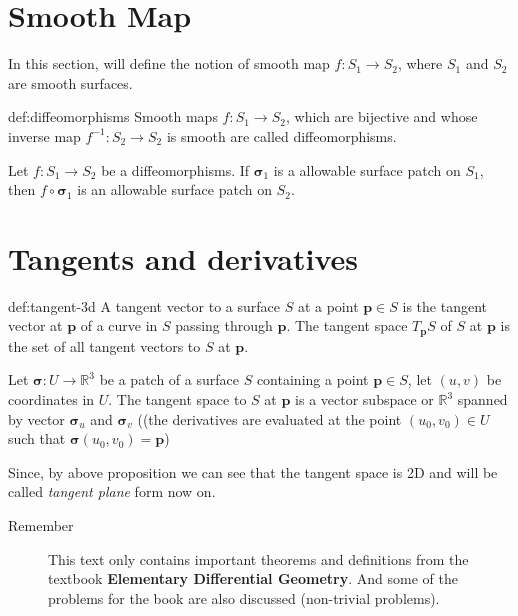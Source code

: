 \documentclass{notes}
\newcommand{\bsigma}{\bm{\sigma}}
\begin{document}
\section{Smooth Map}

In this section, will define the notion of smooth map \(f: S_1 \to S_2\), where \(S_1\) and \(S_2\) are smooth surfaces.
\begin{definition}[Diffeomorphisms]{def:diffeomorphisms}
	Smooth maps \(f: S_1 \to S_2\), which are bijective and whose inverse map 
	\(f^{-1}: S_2 \to S_2\) is smooth are called diffeomorphisms.
\end{definition}

\begin{proposition}{}
	Let \(f: S_1 \to S_2\) be a diffeomorphisms. If \(\bsigma_1\) is a allowable 
	surface patch on \(S_1\), then \(f\circ \bsigma_1\) is an allowable surface
	patch on \(S_2\).
\end{proposition}

\section{Tangents and derivatives}

\begin{definition}[Tangent]{def:tangent-3d}
	A tangent vector to a surface \(S\) at a point \(\bm{p}\in S\) is the tangent vector 
	at \(\bm{p}\) of a curve in \(S\) passing through \(\bm{p}\). The tangent space 
	\(T_{\mathbf{p}} S\) of \(S\) at \(\mathbf{p}\) is the set of
	all tangent vectors to \(S\) at \(\mathbf{p}\).
\end{definition}

\begin{proposition}{}
	Let \(\bsigma: U \to \mathbb{R}^3\) be a patch of a surface \(S\) containing a point 
	\(\mathbf{p}\in S\), let \((u, v)\) be coordinates in \(U\). The tangent space to \(S\)
	at \(\mathbf{p}\) is a vector subspace or \(\mathbb{R}^3\) spanned by vector \(\bsigma_u\)
	and \(\bsigma_v\) ((the derivatives are evaluated at the point 
	$(u_0, v_0 ) \in U$ such that $\bsigma(u_0 , v_0) = \mathbf{p}$)
\end{proposition}
 Since, by above proposition we can see that the tangent space is 2D and will be called 
 \textit{tangent plane} form now on.\par
 

\begin{description}
	\item[Remember] This text only contains important theorems and definitions from the textbook \textbf{Elementary Differential Geometry}.
	 And some of the problems for the book are also discussed (non-trivial problems). 
\end{description}
\end{document}

